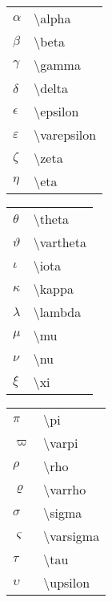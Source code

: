 \documentclass[14pt,a4paper]{extarticle}
\begin{document}
\begin{table}
  \begin{subtable}{.24\textwidth}
    \begin{tabular}{ p{1em} p{9em} }
      $\alpha$ & \textbackslash alpha \\
      $\beta$ & \textbackslash beta \\
      $\gamma$ & \textbackslash gamma \\
      $\delta$ & \textbackslash delta \\
      $\epsilon$ & \textbackslash epsilon \\
      $\varepsilon$ & \textbackslash varepsilon \\
      $\zeta$ & \textbackslash zeta \\
      $\eta$ & \textbackslash eta

    \end{tabular}
  \end{subtable}
  \begin{subtable}{.24\textwidth}
    \begin{tabular}{ p{1em} p{9em}  }

      $\theta$ & \textbackslash theta \\
      $\vartheta$ & \textbackslash vartheta \\
      $\iota$ & \textbackslash iota \\
      $\kappa$ & \textbackslash kappa \\
      $\lambda$ & \textbackslash lambda \\
      $\mu$ & \textbackslash mu \\
      $\nu$ & \textbackslash nu \\
      $\xi$ & \textbackslash xi

    \end{tabular}
  \end{subtable}
  \begin{subtable}{.24\textwidth}
    \begin{tabular}{ p{1em} p{9em}  }

      $\pi$ & \textbackslash pi \\
      $\varpi$ & \textbackslash varpi \\
      $\rho$ & \textbackslash rho \\
      $\varrho$ & \textbackslash varrho \\
      $\sigma$ & \textbackslash sigma \\
      $\varsigma$ & \textbackslash varsigma \\
      $\tau$ & \textbackslash tau \\
      $\upsilon$ & \textbackslash upsilon 


\end{tabular}
\end{subtable}
\end{table}
\end{document}
